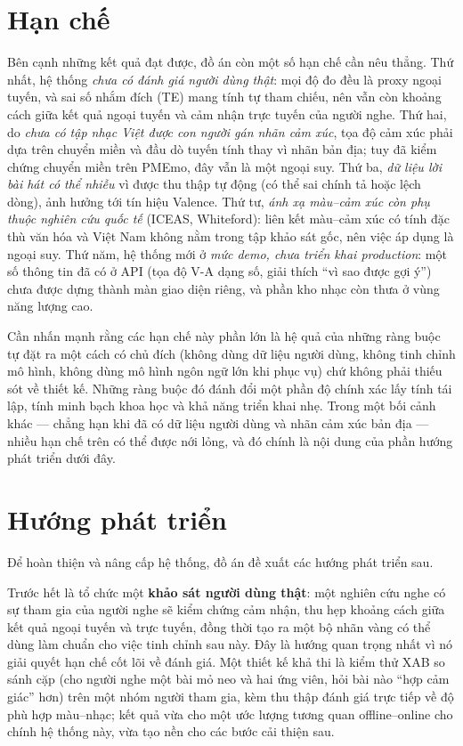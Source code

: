 \documentclass[../DoAn.tex]{subfiles}
\begin{document}
\section{Hạn chế}
Bên cạnh những kết quả đạt được, đồ án còn một số hạn chế cần nêu thẳng. Thứ nhất, hệ thống \textit{chưa có đánh giá người dùng thật}: mọi độ đo đều là proxy ngoại tuyến, và sai số nhắm đích (TE) mang tính tự tham chiếu, nên vẫn còn khoảng cách giữa kết quả ngoại tuyến và cảm nhận trực tuyến của người nghe. Thứ hai, do \textit{chưa có tập nhạc Việt được con người gán nhãn cảm xúc}, tọa độ cảm xúc phải dựa trên chuyển miền và đầu dò tuyến tính thay vì nhãn bản địa; tuy đã kiểm chứng chuyển miền trên PMEmo, đây vẫn là một ngoại suy. Thứ ba, \textit{dữ liệu lời bài hát có thể nhiễu} vì được thu thập tự động (có thể sai chính tả hoặc lệch dòng), ảnh hưởng tới tín hiệu Valence. Thứ tư, \textit{ánh xạ màu--cảm xúc còn phụ thuộc nghiên cứu quốc tế} (ICEAS, Whiteford): liên kết màu--cảm xúc có tính đặc thù văn hóa \cite{jonauskaite2019ml} và Việt Nam không nằm trong tập khảo sát gốc, nên việc áp dụng là ngoại suy. Thứ năm, hệ thống mới ở \textit{mức demo, chưa triển khai production}: một số thông tin đã có ở API (tọa độ V-A dạng số, giải thích ``vì sao được gợi ý'') chưa được dựng thành màn giao diện riêng, và phần kho nhạc còn thưa ở vùng năng lượng cao.

Cần nhấn mạnh rằng các hạn chế này phần lớn là hệ quả của những ràng buộc tự đặt ra một cách có chủ đích (không dùng dữ liệu người dùng, không tinh chỉnh mô hình, không dùng mô hình ngôn ngữ lớn khi phục vụ) chứ không phải thiếu sót về thiết kế. Những ràng buộc đó đánh đổi một phần độ chính xác lấy tính tái lập, tính minh bạch khoa học và khả năng triển khai nhẹ. Trong một bối cảnh khác --- chẳng hạn khi đã có dữ liệu người dùng và nhãn cảm xúc bản địa --- nhiều hạn chế trên có thể được nới lỏng, và đó chính là nội dung của phần hướng phát triển dưới đây.

\section{Hướng phát triển}
Để hoàn thiện và nâng cấp hệ thống, đồ án đề xuất các hướng phát triển sau.

Trước hết là tổ chức một \textbf{khảo sát người dùng thật}: một nghiên cứu nghe có sự tham gia của người nghe sẽ kiểm chứng cảm nhận, thu hẹp khoảng cách giữa kết quả ngoại tuyến và trực tuyến, đồng thời tạo ra một bộ nhãn vàng có thể dùng làm chuẩn cho việc tinh chỉnh sau này. Đây là hướng quan trọng nhất vì nó giải quyết hạn chế cốt lõi về đánh giá. Một thiết kế khả thi là kiểm thử XAB so sánh cặp (cho người nghe một bài mỏ neo và hai ứng viên, hỏi bài nào ``hợp cảm giác'' hơn) trên một nhóm người tham gia, kèm thu thập đánh giá trực tiếp về độ phù hợp màu--nhạc; kết quả vừa cho một ước lượng tương quan offline--online cho chính hệ thống này, vừa tạo nền cho các bước cải thiện sau.
\end{document}

